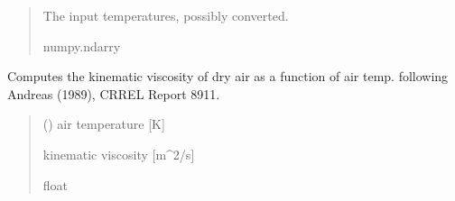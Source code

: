 \documentclass[letterpaper,10pt,english]{sphinxmanual}
\begin{document}
\begin{fulllineitems}
\begin{quote}
\begin{description}
\begin{itemize}
\end{itemize}

\sphinxAtStartPar
{} \textendash{} The input temperatures, possibly converted.

\sphinxAtStartPar
numpy.ndarry

\end{description}\end{quote}

\end{fulllineitems}


\begin{fulllineitems}
\label{\detokenize{users_guide:AirSeaFluxCode.util_subs.visc_air}}
\pysigstartsignatures
\pysiglinewithargsret
{}
{}
{}
\pysigstopsignatures
\sphinxAtStartPar
Computes the kinematic viscosity of dry air as a function of air temp.
following Andreas (1989), CRREL Report 89\sphinxhyphen{}11.
\begin{quote}\begin{description}
\sphinxAtStartPar
{} () \textendash{} air temperature {[}K{]}

\sphinxAtStartPar
{} \textendash{} kinematic viscosity {[}m\textasciicircum{}2/s{]}

\sphinxAtStartPar
float

\end{description}\end{quote}

\end{fulllineitems}
\end{document}

